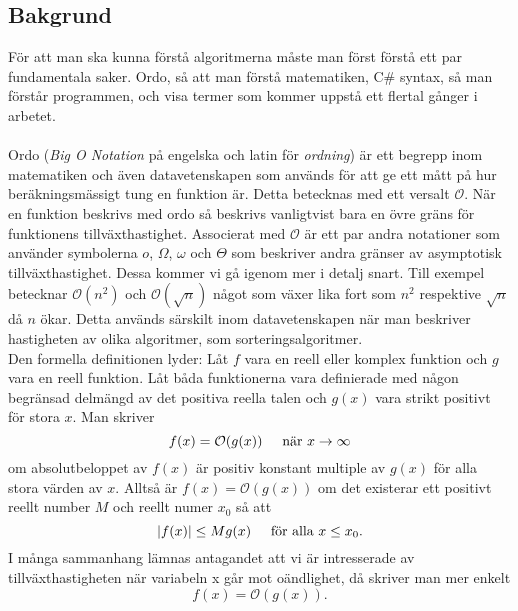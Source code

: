 \documentclass[twocolumn, a4]{article}
\begin{document}
\subsection{Bakgrund}
För att man ska kunna förstå algoritmerna måste man först förstå ett par fundamentala saker. Ordo, så att man förstå matematiken, C\# syntax, så man förstår programmen, och visa termer som kommer uppstå ett flertal gånger i arbetet.\\\\
Ordo (\textit{Big O Notation} på engelska och latin för \textit{ordning}) är ett begrepp inom matematiken och även datavetenskapen som används för att ge ett mått på hur beräkningsmässigt tung en funktion är. Detta betecknas med ett versalt $\mathcal{O}$. När en funktion beskrivs med ordo så beskrivs vanligtvist bara en övre gräns för funktionens tillväxthastighet. Associerat med $\mathcal{O}$ är ett par andra notationer som använder symbolerna $o$, $\Omega$, $\omega$ och $\Theta$ som beskriver andra gränser av asymptotisk tillväxthastighet. Dessa kommer vi gå igenom mer i detalj snart. Till exempel betecknar $\mathcal{O}(n^2)$ och $\mathcal{O}(\sqrt{n})$ något som växer lika fort som $n^2$ respektive $\sqrt{n}$ då $n$ ökar. Detta används särskilt inom datavetenskapen när man beskriver hastigheten av olika algoritmer, som sorteringsalgoritmer. \cite{4, 5}\\
Den formella definitionen lyder: Låt $f$ vara en reell eller komplex funktion och $g$ vara en reell funktion. Låt båda funktionerna vara definierade med någon begränsad delmängd av det positiva reella talen och $g(x)$ vara strikt positivt för stora $x$. Man skriver \cite{6}
\begin{equation*}
    f(x)=\mathcal{O}(g(x))\hspace{5mm}\text{när }x\rightarrow\infty
\end{equation*}
om absolutbeloppet av $f(x)$ är positiv konstant multiple av $g(x)$ för alla stora värden av $x$. Alltså är $f(x)=\mathcal{O}(g(x))$ om det existerar ett positivt reellt number $M$ och reellt numer $x_0$ så att
\begin{equation*}
    |f(x)|\leq Mg(x)\hspace{5mm}\text{för alla }x\leq x_0.
\end{equation*}
I många sammanhang lämnas antagandet att vi är intresserade av tillväxthastigheten när variabeln x går mot oändlighet, då skriver man mer enkelt
\begin{equation*}
   f(x)=\mathcal{O}(g(x)).
\end{equation*}
\end{document}
